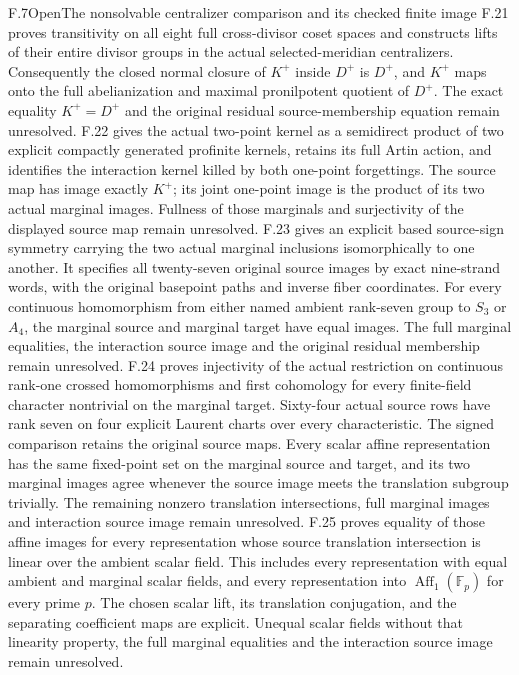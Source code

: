 \begin{claim}{F.7}{Open}{The nonsolvable centralizer comparison and its checked finite image}
F.21 proves transitivity on all eight full cross-divisor coset spaces and constructs lifts of their entire divisor groups in the actual selected-meridian centralizers. Consequently the closed normal closure of $K^+$ inside $D^+$ is $D^+$, and $K^+$ maps onto the full abelianization and maximal pronilpotent quotient of $D^+$. The exact equality $K^+=D^+$ and the original residual source-membership equation remain unresolved.
F.22 gives the actual two-point kernel as a semidirect product of two explicit compactly generated profinite kernels, retains its full Artin action, and identifies the interaction kernel killed by both one-point forgettings. The source map has image exactly $K^+$; its joint one-point image is the product of its two actual marginal images. Fullness of those marginals and surjectivity of the displayed source map remain unresolved.
F.23 gives an explicit based source-sign symmetry carrying the two actual marginal inclusions isomorphically to one another. It specifies all twenty-seven original source images by exact nine-strand words, with the original basepoint paths and inverse fiber coordinates. For every continuous homomorphism from either named ambient rank-seven group to $S_3$ or $A_4$, the marginal source and marginal target have equal images. The full marginal equalities, the interaction source image and the original residual membership remain unresolved.
F.24 proves injectivity of the actual restriction on continuous rank-one crossed homomorphisms and first cohomology for every finite-field character nontrivial on the marginal target. Sixty-four actual source rows have rank seven on four explicit Laurent charts over every characteristic. The signed comparison retains the original source maps. Every scalar affine representation has the same fixed-point set on the marginal source and target, and its two marginal images agree whenever the source image meets the translation subgroup trivially. The remaining nonzero translation intersections, full marginal images and interaction source image remain unresolved.
F.25 proves equality of those affine images for every representation whose source translation intersection is linear over the ambient scalar field. This includes every representation with equal ambient and marginal scalar fields, and every representation into $\operatorname{Aff}_1(\mathbb F_p)$ for every prime $p$. The chosen scalar lift, its translation conjugation, and the separating coefficient maps are explicit. Unequal scalar fields without that linearity property, the full marginal equalities and the interaction source image remain unresolved.

\end{claim}
